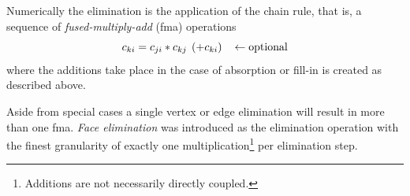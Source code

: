 \documentclass[11pt]{article}
\begin{document}
Numerically the elimination is the application of 
the chain rule, that is, a sequence of {\em fused-multiply-add} (fma) operations
\begin{equation}\label{eqn:fma}
c_{ki}=c_{ji}*c_{kj}\hspace*{1ex}(+c_{ki}) \hspace*{2ex}\gets \mbox{optional}
\end{equation}
where the additions take place in the case of absorption or fill-in is created 
as described above.

Aside from special cases a single vertex or edge elimination will result in more
than one fma. {\em Face elimination} was introduced 
as the elimination operation with the finest granularity of exactly 
one multiplication\footnote{Additions are not necessarily directly coupled.} 
per elimination step.
\end{document}

